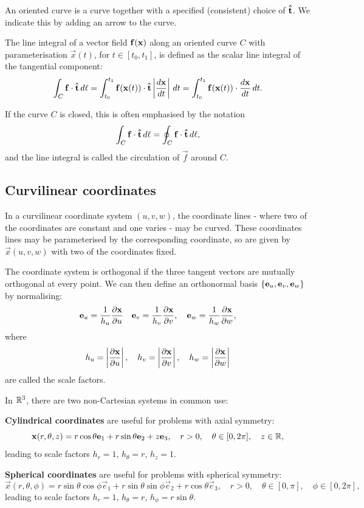 \documentclass[10pt, a4paper]{article}
\begin{document}
An oriented curve is a curve together with a specified
(consistent)
choice of $\hvec{t}$.
We indicate this by adding an arrow to the curve.

The line integral of a vector field $\mbf{f}(\mbf{x})$ along an oriented curve $C$ with parameterisation $\vec{x}(t)$,
for $t \in [t_0, t_1]$,
is defined as the scalar line integral of the tangential component:
\[
\int_{C}\vec{f}\cdot\hvec{t}\,d\ell = \int_{t_0}^{t_1}\vec{f}(\vec{x}(t))\cdot\hvec{t}\left|\frac{d\vec{x}}{dt}\right|\,dt = \int_{t_0}^{t_1}\vec{f}(\vec{x}(t))\cdot\frac{d\vec{x}}{dt}\,dt.
\]

If the curve $C$ is closed,
this is often emphasised by the notation
\[
\int_{C}\vec{f}\cdot\hvec{t}\,d\ell = \oint_{C}\vec{f}\cdot \hvec{t}\,d\ell,
\]
and the line integral is called the circulation of $\vec{f}$ around $C$.

\subsection{Curvilinear coordinates}
In a curvilinear coordinate system $(u, v, w)$,
the coordinate lines -
where two of the coordinates are constant and one varies -
may be curved.
These coordinates lines may be parameterised by the corresponding coordinate,
so are given by $\vec{x}(u, v, w)$ with two of the coordinates fixed.

The coordinate system is orthogonal if the three tangent vectors are mutually orthogonal at every point.
We can then define an orthonormal basis $\{\mbf{e}_u, \mbf{e}_v, \mbf{e}_w\}$ by normalising:
\[
\vec{e}_u = \frac{1}{h_u}\pd[\vec{x}]{u}\quad\vec{e}_v = \frac{1}{h_v}\pd[\vec{x}]{v},\quad\vec{e}_w = \frac{1}{h_w}\pd[\vec{x}]{w},
\]
where
\[
h_u = \left|\pd[\vec{x}]{u}\right|,\quad h_v = \left|\pd[\vec{x}]{v}\right|,\quad h_w = \left|\pd[\vec{x}]{w}\right|
\]
are called the scale factors.

In $\R ^ 3$,
there are two non-Cartesian systems in common use:

\textbf{Cylindrical coordinates} are useful for problems with axial symmetry:
\[
\vec{x}(r, \theta, z) = r\cos{\theta}\vec{e}_1 + r\sin{\theta}\vec{e}_2 + z\vec{e}_3,\quad r > 0,\quad \theta \in [0, 2\pi],\quad z \in \R,
\]
leading to scale factors $h_r = 1$,
$h_{\theta} = r$,
$h_z = 1$.

\textbf{Spherical coordinates} are useful for problems with spherical symmetry:
\[
\vec{x}(r, \theta, \phi) = r\sin{\theta}\cos{\phi}\vec{e}_1 + r\sin{\theta}\sin{\phi}\vec{e}_2 + r\cos{\theta}\vec{e}_3,\quad r > 0,\quad \theta \in [0, \pi],\quad \phi \in [0, 2\pi],
\]
leading to scale factors $h_r = 1$,
$h_{\theta} = r$,
$h_{\phi} = r\sin{\theta}$.
\end{document}
